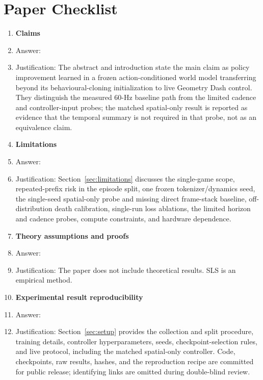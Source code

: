 \section*{Paper Checklist}

\begin{enumerate}

\item {\bf Claims}
    \item[] Answer: \answerYes{}
    \item[] Justification: The abstract and introduction state the main claim as policy improvement learned in a frozen action-conditioned world model transferring beyond its behavioural-cloning initialization to live Geometry Dash control. They distinguish the measured 60-Hz baseline path from the limited cadence and controller-input probes; the matched spatial-only result is reported as evidence that the temporal summary is not required in that probe, not as an equivalence claim.

\item {\bf Limitations}
    \item[] Answer: \answerYes{}
    \item[] Justification: Section~\ref{sec:limitations} discusses the single-game scope, repeated-prefix risk in the episode split, one frozen tokenizer/dynamics seed, the single-seed spatial-only probe and missing direct frame-stack baseline, off-distribution death calibration, single-run loss ablations, the limited horizon and cadence probes, compute constraints, and hardware dependence.

\item {\bf Theory assumptions and proofs}
    \item[] Answer: \answerNA{}
    \item[] Justification: The paper does not include theoretical results. SLS is an empirical method.

\item {\bf Experimental result reproducibility}
    \item[] Answer: \answerYes{}
    \item[] Justification: Section~\ref{sec:setup} provides the collection and split procedure, training details, controller hyperparameters, seeds, checkpoint-selection rules, and live protocol, including the matched spatial-only controller. Code, checkpoints, raw results, hashes, and the reproduction recipe are committed for public release; identifying links are omitted during double-blind review.


\end{enumerate}
